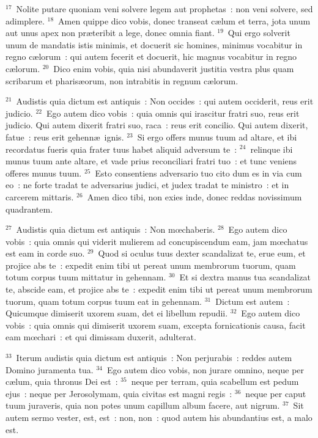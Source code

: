 ${}^{17}$~Nolite putare quoniam veni solvere legem aut prophetas~: non veni solvere, sed adimplere.
${}^{18}$~Amen quippe dico vobis, donec transeat c\ae lum et terra, jota unum aut unus apex non pr\ae teribit a lege, donec omnia fiant.
${}^{19}$~Qui ergo solverit unum de mandatis istis minimis, et docuerit sic homines, minimus vocabitur in regno c\ae lorum~: qui autem fecerit et docuerit, hic magnus vocabitur in regno c\ae lorum.
${}^{20}$~Dico enim vobis, quia nisi abundaverit justitia vestra plus quam scribarum et pharis\ae orum, non intrabitis in regnum c\ae lorum.


${}^{21}$~Audistis quia dictum est antiquis~: Non occides~: qui autem occiderit, reus erit judicio.
${}^{22}$~Ego autem dico vobis~: quia omnis qui irascitur fratri suo, reus erit judicio. Qui autem dixerit fratri suo, raca~: reus erit concilio. Qui autem dixerit, fatue~: reus erit gehenn\ae\ ignis.
${}^{23}$~Si ergo offers munus tuum ad altare, et ibi recordatus fueris quia frater tuus habet aliquid adversum te~:
${}^{24}$~relinque ibi munus tuum ante altare, et vade prius reconciliari fratri tuo~: et tunc veniens offeres munus tuum.
${}^{25}$~Esto consentiens adversario tuo cito dum es in via cum eo~: ne forte tradat te adversarius judici, et judex tradat te ministro~: et in carcerem mittaris.
${}^{26}$~Amen dico tibi, non exies inde, donec reddas novissimum quadrantem.


${}^{27}$~Audistis quia dictum est antiquis~: Non mœchaberis.
${}^{28}$~Ego autem dico vobis~: quia omnis qui viderit mulierem ad concupiscendum eam, jam mœchatus est eam in corde suo.
${}^{29}$~Quod si oculus tuus dexter scandalizat te, erue eum, et projice abs te~: expedit enim tibi ut pereat unum membrorum tuorum, quam totum corpus tuum mittatur in gehennam.
${}^{30}$~Et si dextra manus tua scandalizat te, abscide eam, et projice abs te~: expedit enim tibi ut pereat unum membrorum tuorum, quam totum corpus tuum eat in gehennam.
${}^{31}$~Dictum est autem~: Quicumque dimiserit uxorem suam, det ei libellum repudii.
${}^{32}$~Ego autem dico vobis~: quia omnis qui dimiserit uxorem suam, excepta fornicationis causa, facit eam mœchari~: et qui dimissam duxerit, adulterat.


${}^{33}$~Iterum audistis quia dictum est antiquis~: Non perjurabis~: reddes autem Domino juramenta tua.
${}^{34}$~Ego autem dico vobis, non jurare omnino, neque per c\ae lum, quia thronus Dei est~:
${}^{35}$~neque per terram, quia scabellum est pedum ejus~: neque per Jerosolymam, quia civitas est magni regis~:
${}^{36}$~neque per caput tuum juraveris, quia non potes unum capillum album facere, aut nigrum.
${}^{37}$~Sit autem sermo vester, est, est~: non, non~: quod autem his abundantius est, a malo est.


